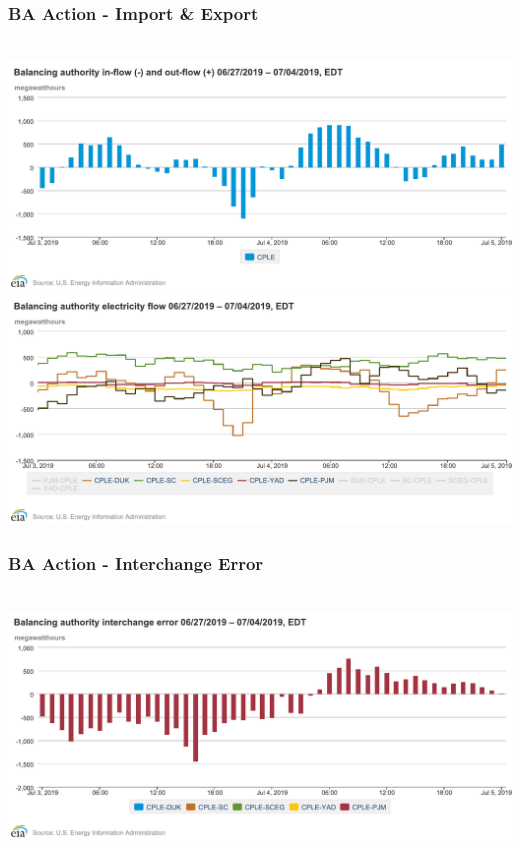 \documentclass[14pt, unknownkeysallowed]{beamer}
\begin{document}
\begin{frame}
\frametitle{BA Action - Import \& Export} \ \vspace{.5em}
{\centering
{\includegraphics[height=.4\textheight]{chart2} 
\includegraphics[height=.4\textheight]{chart3}} %
}
\end{frame}
\begin{frame}
\frametitle{BA Action - Interchange Error} \ \vspace{.5em}
{\centering
{\includegraphics[height=.6\textheight]{chart4}} %
}
\end{frame}
\end{document}
